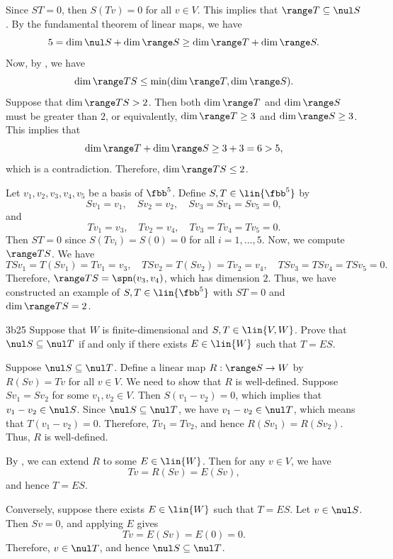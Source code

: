 \begin{solenum}
    \item Since $ST = 0$, then $S(Tv) = 0$ for all $v \in V$.
	This implies that $\range T \subseteq \nul S$.
	By the fundamental theorem of linear maps, we have
    \[
    	5 = \dim \nul S + \dim \range S \geq \dim \range T + \dim \range S.
    \]
    Now, by , we have
    \[
    	\dim \range TS \leq \min(\dim \range T, \dim \range S).
    \]
    Suppose that $\dim \range TS > 2$.
	Then both $\dim \range T$ and $\dim \range S$ must be greater than $2$, or equivalently, $\dim \range T \geq 3$ and $\dim \range S \geq 3$.
	This implies that
    \[
    	\dim \range T + \dim \range S \geq 3 + 3 = 6 > 5,
    \]
    which is a contradiction.
	Therefore, $\dim \range TS \leq 2$.
    \item Let $v_1, v_2, v_3, v_4, v_5$ be a basis of $\fbb^5$.
	Define $S, T \in \lin{\fbb^5}$ by
    \[
    	Sv_1 = v_1, \quad Sv_2 = v_2, \quad Sv_3 = Sv_4 = Sv_5 = 0,
    \]
    and
    \[
    	Tv_1 = v_3, \quad Tv_2 = v_4, \quad Tv_3 = Tv_4 = Tv_5 = 0.
    \]
    Then $ST = 0$ since $S(Tv_i) = S(0) = 0$ for all $i = 1, \ldots, 5$.
	Now, we compute $\range TS$.
	We have
    \[
    	TSv_1 = T(Sv_1) = Tv_1 = v_3, \quad TSv_2 = T(Sv_2) = Tv_2 = v_4, \quad TSv_3 = TSv_4 = TSv_5 = 0.
    \]
    Therefore, $\range TS = \spn(v_3, v_4)$, which has dimension $2$.
	Thus, we have constructed an example of $S, T \in \lin{\fbb^5}$ with $ST = 0$ and $\dim \range TS = 2$.
\end{solenum}

\begin{exercise}{3b25}
    Suppose that $W$ is finite-dimensional and $S, T \in \lin{V, W}$.
	Prove that $\nul S \subseteq \nul T$ if and only if there exists $E \in \lin{W}$ such that $T = ES$.

\end{exercise}

\begin{sol}
    Suppose $\nul S \subseteq \nul T$.
	Define a linear map $R: \range S \to W$ by $R(Sv) = Tv$ for all $v \in V$.
	We need to show that $R$ is well-defined.
	Suppose $Sv_1 = Sv_2$ for some $v_1, v_2 \in V$.
	Then $S(v_1 - v_2) = 0$, which implies that $v_1 - v_2 \in \nul S$.
	Since $\nul S \subseteq \nul T$, we have $v_1 - v_2 \in \nul T$, which means that $T(v_1 - v_2) = 0$.
	Therefore, $Tv_1 = Tv_2$, and hence $R(Sv_1) = R(Sv_2)$.
	Thus, $R$ is well-defined.

    By , we can extend $R$ to some $E \in \lin{W}$.
	Then for any $v \in V$, we have
    \[
    	Tv = R(Sv) = E(Sv),
    \]
    and hence $T = ES$.

    Conversely, suppose there exists $E \in \lin{W}$ such that $T = ES$.
	Let $v \in \nul S$.
	Then $Sv = 0$, and applying $E$ gives
    \[
    	Tv = E(Sv) = E(0) = 0.
    \]
    Therefore, $v \in \nul T$, and hence $\nul S \subseteq \nul T$.
\end{sol}

